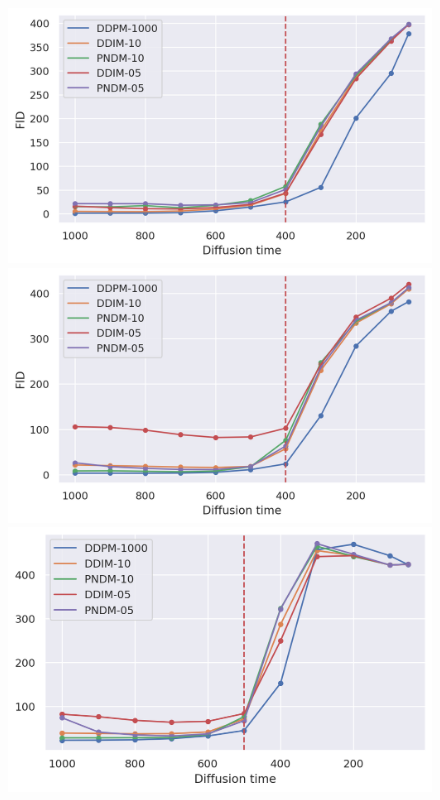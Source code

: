 \documentclass{article}
\begin{document}
\begin{figure}[ht!]
\centering
\begin{minipage}[b]{.353\textwidth}
  \begin{minipage}[b]{\textwidth}
    \centering
    \includegraphics[width=\textwidth]{figs/plots/mnist_late_starts_.png}
  \end{minipage}\vfill
  \begin{minipage}[b]{\textwidth}
    \centering
    \includegraphics[width=\textwidth]{figs/plots/cifar10_late_starts__.png}
  \end{minipage}
\end{minipage}%
\begin{minipage}[b]{.34\textwidth}
  \begin{minipage}[b]{\textwidth}
    \centering
    \includegraphics[width=\textwidth]{figs/plots/imagenet64_late_starts_.png}

\end{minipage}
\end{minipage}
\end{figure}
\end{document}
